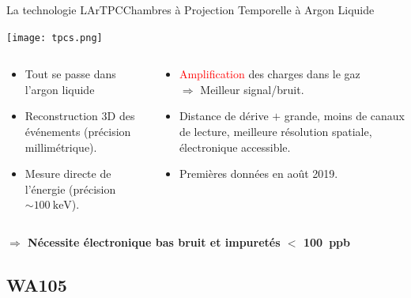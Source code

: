     \begin{frame}{La technologie LArTPC}{Chambres à Projection Temporelle à Argon Liquide}
       	\begin{scriptsize}
       			\centering\texttt{[image: tpcs.png]}\\
       			\begin{columns}
       				\begin{column}{0.5\textwidth}
       					\begin{itemize}
           					\item Tout se passe dans l'argon liquide
       						\item Reconstruction 3D des événements (précision millimétrique).
       						\item Mesure directe de l'énergie (précision $\sim\SI{100}{\kilo\electronvolt}$).
       					\end{itemize}
       				\end{column}
       				\begin{column}{0.5\textwidth}
       					\begin{itemize}
       						\item \textcolor{red}{Amplification} des charges dans le gaz\\$\Rightarrow$ Meilleur signal/bruit.
       						\item Distance de dérive $+$ grande, moins de canaux de lecture, meilleure résolution spatiale, électronique accessible.
       						\item Premières données en août 2019.
       					\end{itemize}
       				\end{column}
       			\end{columns}
       			\vfill
       			\textbf{$\Rightarrow$ Nécessite électronique bas bruit et impuretés $<$ \SI{100}{ppb}}
       	\end{scriptsize}
    \end{frame}
    
    \subsection{WA105}

